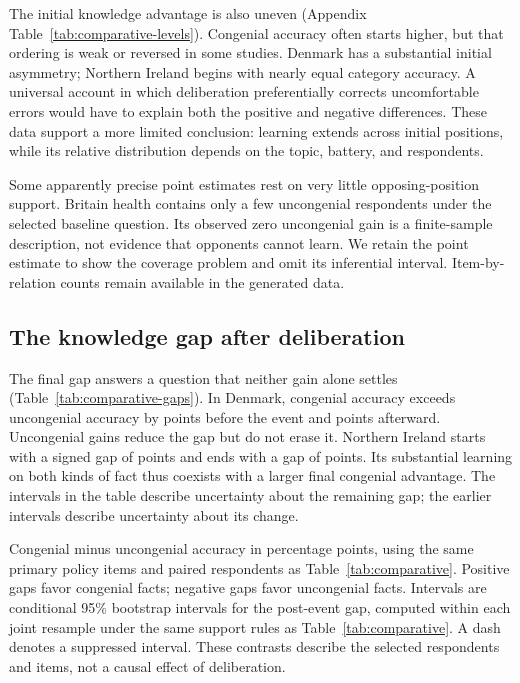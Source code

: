 \documentclass[11pt]{article}
\newcommand{\tabnote}[1]{\par\smallskip\begin{minipage}{\linewidth}\footnotesize #1\end{minipage}}
\begin{document}
The initial knowledge advantage is also uneven (Appendix Table~\ref{tab:comparative-levels}). Congenial accuracy often starts higher, but that ordering is weak or reversed in some studies. Denmark has a substantial initial asymmetry; Northern Ireland begins with nearly equal category accuracy. A universal account in which deliberation preferentially corrects uncomfortable errors would have to explain both the positive and negative differences. These data support a more limited conclusion: learning extends across initial positions, while its relative distribution depends on the topic, battery, and respondents.

Some apparently precise point estimates rest on very little opposing-position support. Britain health contains only a few uncongenial respondents under the selected baseline question. Its observed zero uncongenial gain is a finite-sample description, not evidence that opponents cannot learn. We retain the point estimate to show the coverage problem and omit its inferential interval. Item-by-relation counts remain available in the generated data.

\subsection{The knowledge gap after deliberation}

The final gap answers a question that neither gain alone settles (Table~\ref{tab:comparative-gaps}). In Denmark, congenial accuracy exceeds uncongenial accuracy by \dkGapPre{} points before the event and \dkGapPost{} points afterward. Uncongenial gains reduce the gap but do not erase it. Northern Ireland starts with a signed gap of \niGapPre{} points and ends with a gap of \niGapPost{} points. Its substantial learning on both kinds of fact thus coexists with a larger final congenial advantage. The intervals in the table describe uncertainty about the remaining gap; the earlier intervals describe uncertainty about its change.

\begin{table}[!htbp]
\centering\small
\caption{Knowledge gaps before and after deliberation.}
\label{tab:comparative-gaps}

\tabnote{Congenial minus uncongenial accuracy in percentage points, using the same primary policy items and paired respondents as Table~\ref{tab:comparative}. Positive gaps favor congenial facts; negative gaps favor uncongenial facts. Intervals are conditional 95\% bootstrap intervals for the post-event gap, computed within each joint resample under the same support rules as Table~\ref{tab:comparative}. A dash denotes a suppressed interval. These contrasts describe the selected respondents and items, not a causal effect of deliberation.}
\end{table}
\end{document}
